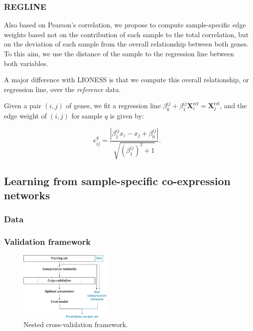 \documentclass{bioinfo}
\newcommand{\xref}{{\bm X}^{\mbox{ref}}}
\begin{document}
\begin{methods}
\subsubsection{REGLINE}
Also based on Pearson's correlation, we propose to compute sample-specific edge weights based not on the contribution of each sample to the total correlation, but on the deviation of each sample from the overall relationship between both genes. To this aim, we use the distance of the sample to the regression line between both variables.

A major difference with LIONESS is that we compute this overall relationship, or regression line, over the {\em reference} data.

Given a pair $(i, j)$ of genes, we fit a regression line $\beta_0^{ij} + \beta_1^{ij} \xref_i = \xref_j$, and the edge weight of $(i, j)$ for sample $q$ is given by:

\[
e_{ij}^q = \frac{|\beta_1^{ij} x_i - x_j + \beta_0^{ij}|}{\sqrt{(\beta_1^{ij})^2+1}}.
\]


\subsection{Learning from sample-specific co-expression networks}

\subsubsection{Data}

\subsubsection{Validation framework}

\begin{figure}[!tpb]
  \centerline{\includegraphics[width=0.4\textwidth]{eval_framework.pdf}}
  \caption{Nested cross-validation framework.}
  \label{fig:eval_framework}
\end{figure}




\end{methods}
\end{document}
